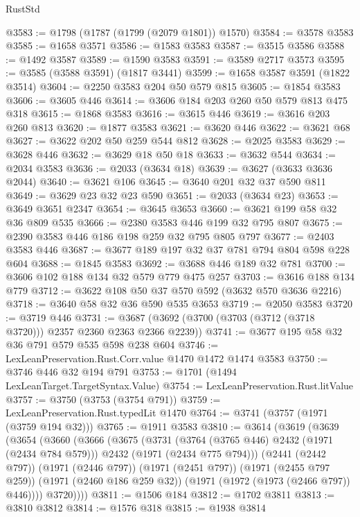 \begin{lexlean}{RustStd}
\begin{coremodule}
{\begin{coremodule}
{{{{{{{{{{{{{@3583 := @1798 (@1787 (@1799 (@2079 @1801)) @1570)
@3584 := @3578 @3583
@3585 := @1658 @3571
@3586 := @1583 @3583
@3587 := @3515 @3586
@3588 := @1492 @3587
@3589 := @1590 @3583
@3591 := @3589 @2717 @3573
@3595 := @3585 (@3588 @3591) (@1817 @3441)
@3599 := @1658 @3587 @3591 (@1822 @3514)
@3604 := @2250 @3583 @204 @50 @579 @815
@3605 := @1854 @3583
@3606 := @3605 @446
@3614 := @3606 @184 @203 @260 @50 @579 @813 @475 @318
@3615 := @1868 @3583
@3616 := @3615 @446
@3619 := @3616 @203 @260 @813
@3620 := @1877 @3583
@3621 := @3620 @446
@3622 := @3621 @68
@3627 := @3622 @202 @50 @259 @544 @812
@3628 := @2025 @3583
@3629 := @3628 @446
@3632 := @3629 @18 @50 @18
@3633 := @3632 @544
@3634 := @2034 @3583
@3636 := @2033 (@3634 @18)
@3639 := @3627 (@3633 @3636 @2044)
@3640 := @3621 @106
@3645 := @3640 @201 @32 @37 @590 @811
@3649 := @3629 @23 @32 @23 @590
@3651 := @2033 (@3634 @23)
@3653 := @3649 @3651 @2347
@3654 := @3645 @3653
@3660 := @3621 @199 @58 @32 @36 @809 @535
@3666 := @2380 @3583 @446 @199 @32 @795 @807
@3675 := @2390 @3583 @446 @186 @198 @259 @32 @795 @805 @797
@3677 := @2403 @3583 @446
@3687 := @3677 @189 @197 @32 @37 @781 @794 @804 @598 @228 @604
@3688 := @1845 @3583
@3692 := @3688 @446 @189 @32 @781
@3700 := @3606 @102 @188 @134 @32 @579 @779 @475 @257
@3703 := @3616 @188 @134 @779
@3712 := @3622 @108 @50 @37 @570 @592 (@3632 @570 @3636 @2216)
@3718 := @3640 @58 @32 @36 @590 @535 @3653
@3719 := @2050 @3583
@3720 := @3719 @446
@3731 := @3687 (@3692 (@3700 (@3703 (@3712 (@3718 @3720))) @2357 @2360 @2363 @2366 @2239))
@3741 := @3677 @195 @58 @32 @36 @791 @579 @535 @598 @238 @604
@3746 := LexLeanPreservation.Rust.Corr.value @1470 @1472 @1474 @3583
@3750 := @3746 @446 @32 @194 @791
@3753 := @1701 (@1494 LexLeanTarget.TargetSyntax.Value)
@3754 := LexLeanPreservation.Rust.litValue
@3757 := @3750 (@3753 (@3754 @791))
@3759 := LexLeanPreservation.Rust.typedLit @1470
@3764 := @3741 (@3757 (@1971 (@3759 @194 @32)))
@3765 := @1911 @3583
@3810 := @3614
    (@3619
      (@3639
        (@3654
          (@3660
            (@3666
              (@3675
                (@3731
                  (@3764 (@3765 @446) @2432 (@1971 (@2434 @784 @579)))
                  @2432
                  (@1971 (@2434 @775 @794)))
                (@2441 (@2442 @797))
                (@1971 (@2446 @797))
                (@1971 (@2451 @797))
                (@1971 (@2455 @797 @259))
                (@1971 (@2460 @186 @259 @32))
                (@1971 (@1972 (@1973 (@2466 @797)) @446))))
            @3720))))
@3811 := @1506 @184
@3812 := @1702 @3811
@3813 := @3810 @3812
@3814 := @1576 @318
@3815 := @1938 @3814
}}}}}}}}}}}}}
\end{coremodule}}
\end{coremodule}
\end{lexlean}
